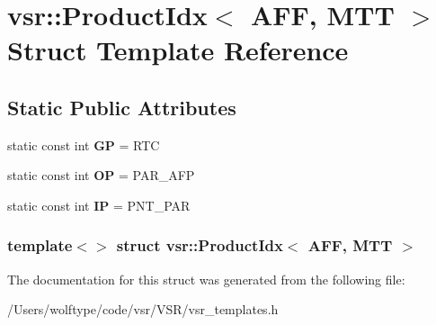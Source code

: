 \hypertarget{structvsr_1_1_product_idx_3_01_a_f_f_00_01_m_t_t_01_4}{\section{vsr\-:\-:Product\-Idx$<$ A\-F\-F, M\-T\-T $>$ Struct Template Reference}
\label{structvsr_1_1_product_idx_3_01_a_f_f_00_01_m_t_t_01_4}
}
\subsection*{Static Public Attributes}
\begin{DoxyCompactItemize}
\item 
\hypertarget{structvsr_1_1_product_idx_3_01_a_f_f_00_01_m_t_t_01_4_adb62ae517475ba3440230b6ca7797ced}{static const int {\bfseries G\-P} = R\-T\-C}\label{structvsr_1_1_product_idx_3_01_a_f_f_00_01_m_t_t_01_4_adb62ae517475ba3440230b6ca7797ced}

\item 
\hypertarget{structvsr_1_1_product_idx_3_01_a_f_f_00_01_m_t_t_01_4_a0189c6b05a221003fda448ed890b5b50}{static const int {\bfseries O\-P} = P\-A\-R\-\_\-\-A\-F\-P}\label{structvsr_1_1_product_idx_3_01_a_f_f_00_01_m_t_t_01_4_a0189c6b05a221003fda448ed890b5b50}

\item 
\hypertarget{structvsr_1_1_product_idx_3_01_a_f_f_00_01_m_t_t_01_4_af126bbe111e4f121fc73438c3665f13b}{static const int {\bfseries I\-P} = P\-N\-T\-\_\-\-P\-A\-R}\label{structvsr_1_1_product_idx_3_01_a_f_f_00_01_m_t_t_01_4_af126bbe111e4f121fc73438c3665f13b}

\end{DoxyCompactItemize}
\subsubsection*{template$<$$>$ struct vsr\-::\-Product\-Idx$<$ A\-F\-F, M\-T\-T $>$}



The documentation for this struct was generated from the following file\-:\begin{DoxyCompactItemize}
\item 
/\-Users/wolftype/code/vsr/\-V\-S\-R/vsr\-\_\-templates.\-h\end{DoxyCompactItemize}
